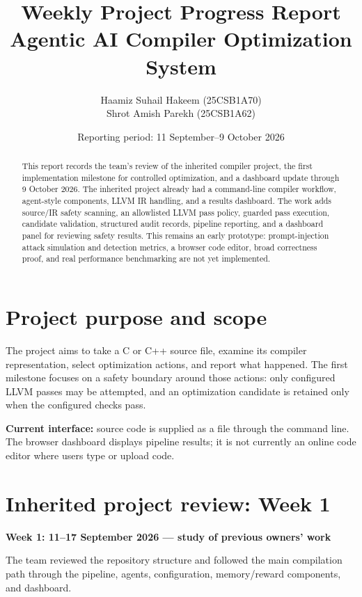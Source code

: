 \documentclass[11pt]{article}
\title{\vspace{-1.2em}\textbf{Weekly Project Progress Report}\\
\large Agentic AI Compiler Optimization System}
\author{Haamiz Suhail Hakeem (25CSB1A70)\\
Shrot Amish Parekh (25CSB1A62)}
\date{Reporting period: 11 September--9 October 2026}
\begin{document}
\maketitle
\vspace{-1.5em}

\begin{abstract}
This report records the team's review of the inherited compiler project, the first implementation milestone for controlled optimization, and a dashboard update through 9 October 2026. The inherited project already had a command-line compiler workflow, agent-style components, LLVM IR handling, and a results dashboard. The work adds source/IR safety scanning, an allowlisted LLVM pass policy, guarded pass execution, candidate validation, structured audit records, pipeline reporting, and a dashboard panel for reviewing safety results. This remains an early prototype: prompt-injection attack simulation and detection metrics, a browser code editor, broad correctness proof, and real performance benchmarking are not yet implemented.
\end{abstract}

\section{Project purpose and scope}
The project aims to take a C or C++ source file, examine its compiler representation, select optimization actions, and report what happened. The first milestone focuses on a safety boundary around those actions: only configured LLVM passes may be attempted, and an optimization candidate is retained only when the configured checks pass.

\noindent\textbf{Current interface:} source code is supplied as a file through the command line. The browser dashboard displays pipeline results; it is not currently an online code editor where users type or upload code.

\section{Inherited project review: Week 1}
\textbf{Week 1: 11--17 September 2026 --- study of previous owners' work}

The team reviewed the repository structure and followed the main compilation path through the pipeline, agents, configuration, memory/reward components, and dashboard.
\end{document}
